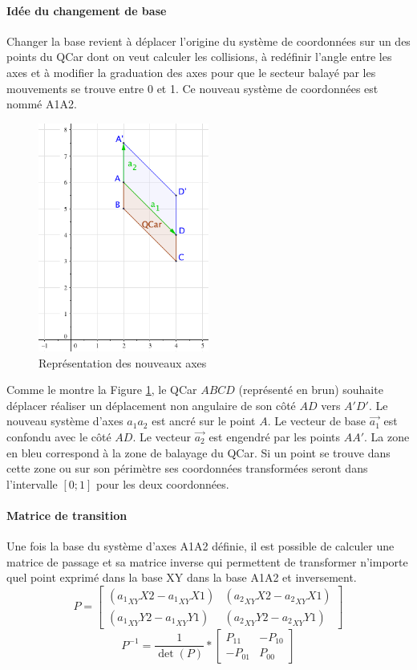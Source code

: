 \documentclass[a4paper, 12pt]{article}
\begin{document}
\paragraph{Idée du changement de base}
Changer la base revient à déplacer l'origine du système de coordonnées sur un des points du QCar dont on veut calculer les collisions, à redéfinir l'angle entre les axes et à modifier la graduation des axes pour que le secteur balayé par les mouvements se trouve entre 0 et 1. Ce nouveau système de coordonnées est nommé A1A2.
\begin{figure}[H]
 \centering
 \includegraphics[width=0.5\textwidth]{includes/images/physique_conception_01}
 \caption{\label{fig:physique_conception_01}Représentation des nouveaux axes}
\end{figure}
Comme le montre la Figure \ref{fig:physique_conception_01}, le QCar $ABCD$ (représenté en brun) souhaite déplacer réaliser un déplacement non angulaire de son côté $AD$ vers $A'D'$. Le nouveau système d'axes $a_1a_2$ est ancré sur le point $A$. Le vecteur de base $\overrightarrow{a_1}$ est confondu avec le côté $AD$. Le vecteur $\overrightarrow{a_2}$ est engendré par les points $AA'$. La zone en bleu correspond à la zone de balayage du QCar. Si un point se trouve dans cette zone ou sur son périmètre ses coordonnées transformées seront dans l'intervalle $[0;1]$ pour les deux coordonnées.
\paragraph{Matrice de transition}
Une fois la base du système d'axes A1A2 définie, il est possible de calculer une matrice de passage et sa matrice inverse qui permettent de transformer n'importe quel point exprimé dans la base XY dans la base A1A2 et inversement.
\[
 P =
 \begin{bmatrix}
 ({a_1}_{XY}X2 - {a_1}_{XY}X1) & ({a_2}_{XY}X2 - {a_2}_{XY}X1) \\
 ({a_1}_{XY}Y2 - {a_1}_{XY}Y1) & ({a_2}_{XY}Y2 - {a_2}_{XY}Y1)
 \end{bmatrix}
\]
\[
 P^{-1} = \frac{1}{\det(P)} * 
 \begin{bmatrix}
 P_{11} & -P_{10} \\
 -P_{01} & P_{00}
 \end{bmatrix}
\]
\end{document}
